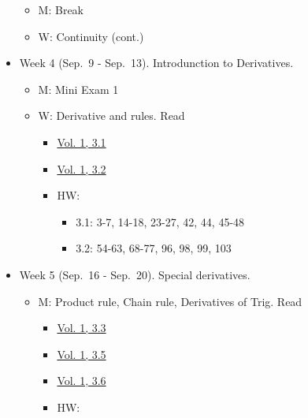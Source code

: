 \documentclass[
]{article}
\providecommand{\tightlist}{%
  \setlength{\itemsep}{0pt}\setlength{\parskip}{0pt}}
\begin{document}
\begin{itemize}
  \begin{itemize}
  \tightlist
  \item
    M: Break
  \item
    W: Continuity (cont.)
  \end{itemize}
\item
  Week 4 (Sep.~9 - Sep.~13). Introdunction to Derivatives.

  \begin{itemize}
  \tightlist
  \item
    M: Mini Exam 1
  \item
    W: Derivative and rules. Read

    \begin{itemize}
    \tightlist
    \item
      \href{https://openstax.org/books/calculus-volume-1/pages/3-1-defining-the-derivative}{Vol. 1, 3.1}
    \item
      \href{https://openstax.org/books/calculus-volume-1/pages/3-2-the-derivative-as-a-function}{Vol. 1, 3.2}
    \item
      HW:

      \begin{itemize}
      \tightlist
      \item
        3.1: 3-7, 14-18, 23-27, 42, 44, 45-48
      \item
        3.2: 54-63, 68-77, 96, 98, 99, 103
      \end{itemize}
    \end{itemize}
  \end{itemize}
\item
  Week 5 (Sep.~16 - Sep.~20). Special derivatives.

  \begin{itemize}
  \tightlist
  \item
    M: Product rule, Chain rule, Derivatives of Trig. Read

    \begin{itemize}
    \tightlist
    \item
      \href{https://openstax.org/books/calculus-volume-1/pages/3-3-differentiation-rules}{Vol. 1, 3.3}
    \item
      \href{https://openstax.org/books/calculus-volume-1/pages/3-5-derivatives-of-trigonometric-functions}{Vol. 1, 3.5}
    \item
      \href{https://openstax.org/books/calculus-volume-1/pages/3-6-the-chain-rule}{Vol. 1, 3.6}
    \item
      HW:


\end{itemize}
\end{itemize}
\end{itemize}
\end{document}

